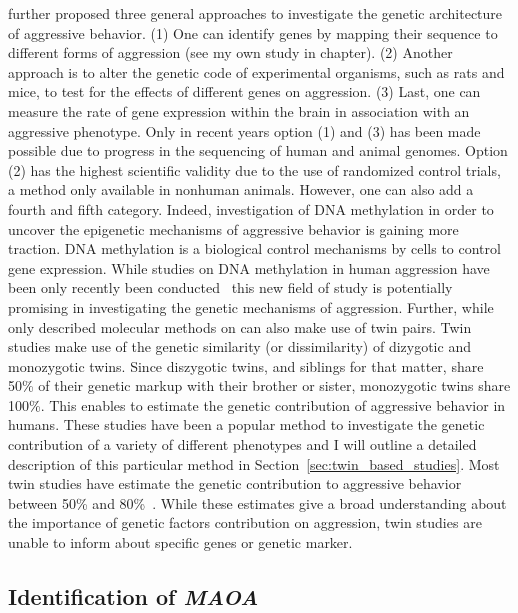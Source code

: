 \documentclass[../header.tex]{subfiles}
\begin{document}
\citet{Maxson2005} further proposed three general approaches to investigate the genetic architecture of aggressive behavior.
(1) One can identify genes by mapping their sequence to different forms of aggression (see my own study in chapter). %
(2) Another approach is to alter the genetic code of experimental organisms, such as rats and mice, to test for the effects of different genes on aggression.
(3) Last, one can measure the rate of gene expression within the brain in association with an aggressive phenotype.
Only in recent years option (1) and (3) has been made possible due to progress in the sequencing of human and animal genomes.
Option (2) has the highest scientific validity due to the use of randomized control trials, a method only available in nonhuman animals.
However, one can also add a fourth and fifth category.
Indeed, investigation of DNA methylation in order to uncover the epigenetic mechanisms of aggressive behavior is gaining more traction.
DNA methylation is a biological control mechanisms by cells to control gene expression.
While studies on DNA methylation in human aggression have been only recently been conducted~\cite{VanDongen2015a} this new field of study is potentially promising in investigating the genetic mechanisms of aggression.
Further, while~\citet{Maxson2005} only described molecular methods on can also make use of twin pairs.
Twin studies make use of the genetic similarity (or dissimilarity) of dizygotic and monozygotic twins.
Since diszygotic twins, and siblings for that matter, share 50\% of their genetic markup with their brother or sister, monozygotic twins share 100\%.
This enables to estimate the genetic contribution of aggressive behavior in humans.
These studies have been a popular method to investigate the genetic contribution of a variety of different phenotypes and I will outline a detailed description of this particular method in Section~\ref{sec:twin_based_studies}. 
Most twin studies have estimate the genetic contribution to aggressive behavior between 50\% and 80\%~\cite{Porsch2016}.
While these estimates give a broad understanding about the importance of genetic factors contribution on aggression, twin studies are unable to inform about specific genes or genetic marker.

\subsection{Identification of \textit{MAOA}}
\label{sub:identification_of_MAOA}
\end{document}
